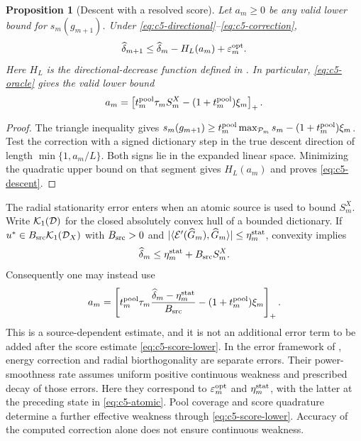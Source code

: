 \documentclass[11pt]{article}
\newtheorem{proposition}[theorem]{Proposition}
\theoremstyle{remark}
\begin{document}
\begin{proposition}[Descent with a resolved score]
\label{prop:c5-descent}
Let $a_m\geq0$ be any valid lower bound for $s_m(g_{m+1})$.
Under \eqref{eq:c5-directional}--\eqref{eq:c5-correction},
\begin{equation}
 \widehat\delta_{m+1}\leq\widehat\delta_m-H_L(a_m)
                       +\varepsilon_m^{\rm opt}.
 \label{eq:c5-descent}
\end{equation}
Here $H_L$ is the directional-decrease function defined in \CGAHLDreference.
In particular, \eqref{eq:c5-oracle} gives the valid lower bound
\begin{equation}
 a_m=\left[t_m^{\rm pool}\tau_m S_m^X
                 -(1+t_m^{\rm pool})\xi_m\right]_+ .
 \label{eq:c5-score-lower}
\end{equation}
\end{proposition}
\begin{proof}
The triangle inequality gives
$s_m(g_{m+1})\geq
t_m^{\rm pool}\max_{\mathcal P_m}s_m-(1+t_m^{\rm pool})\xi_m$.
Test the correction with a signed dictionary step in the true descent
direction of length $\min\{1,a_m/L\}$. Both signs lie in the expanded
linear space. Minimizing the quadratic upper bound on that segment
gives $H_L(a_m)$ and proves \eqref{eq:c5-descent}.
\end{proof}

The radial stationarity error enters when an atomic source is used to
bound $S_m^X$. Write $\mathcal K_1(\mathcal D)$ for the closed absolutely convex hull
of a bounded dictionary. If
$u^*\in B_{\rm src}\mathcal K_1(\mathcal D_X)$ with $B_{\rm src}>0$ and
$|\langle\mathcal E'(\widehat G_m),\widehat G_m\rangle|
\leq\eta_m^{\rm stat}$, convexity implies
\begin{equation}
 \widehat\delta_m\leq\eta_m^{\rm stat}+B_{\rm src}S_m^X .
 \label{eq:c5-atomic}
\end{equation}
Consequently one may instead use
\[
 a_m=\left[
 t_m^{\rm pool}\tau_m
       \frac{\widehat\delta_m-\eta_m^{\rm stat}}{B_{\rm src}}
 -(1+t_m^{\rm pool})\xi_m\right]_+ .
\]
This is a source-dependent estimate, and it is not an additional error
term to be added after the score estimate \eqref{eq:c5-score-lower}.
In the error framework of \cite[Section~3, Theorem~3.2 and
Lemma~6.3]{DereventsovTemlyakov2022}, energy correction and radial
biorthogonality are separate errors. Their power-smoothness rate assumes
uniform positive continuous weakness and prescribed decay of those errors.
Here they correspond to $\varepsilon_m^{\rm opt}$ and
$\eta_m^{\rm stat}$, with the latter at the preceding state in
\eqref{eq:c5-atomic}. Pool coverage and score quadrature determine a further
effective weakness through \eqref{eq:c5-score-lower}. Accuracy of the
computed correction alone does not ensure continuous weakness.
\end{document}
